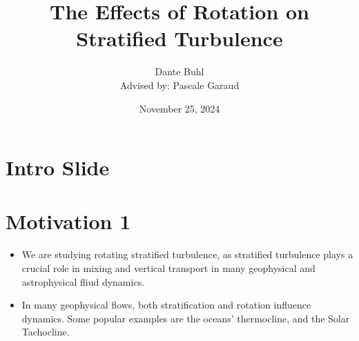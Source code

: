 \documentclass{article}
\begin{document}
\title{The Effects of Rotation on Stratified Turbulence}
\author{Dante Buhl \\{\small Advised by: Pascale Garaud}}
\date{November 25, 2024}


\newcommand{\wrms}{w_{\text{rms}}}
\newcommand{\bs}[1]{\boldsymbol{#1}}
\newcommand{\tb}[1]{\textbf{#1}}
\newcommand{\bmp}[1]{\begin{minipage}{#1\textwidth}}
\newcommand{\emp}{\end{minipage}}
\newcommand{\R}{\mathbb{R}}
\newcommand{\C}{\mathbb{C}}
\newcommand{\N}{\mathcal{N}}
\newcommand{\K}{\bs{\mathrm{K}}}
\newcommand{\m}{\bs{\mu}_*}
\newcommand{\s}{\bs{\Sigma}_*}
\newcommand{\dt}{\Delta t}
\newcommand{\dx}{\Delta x}
\newcommand{\tr}[1]{\text{Tr}(#1)}
\newcommand{\Tr}[1]{\text{Tr}(#1)}
\newcommand{\Div}{\nabla \cdot}
\renewcommand{\div}{\nabla \cdot}
\newcommand{\Curl}{\nabla \times}
\newcommand{\Grad}{\nabla}
\newcommand{\grad}{\nabla}
\newcommand{\grads}{\nabla_s}
\newcommand{\gradf}{\nabla_f}
\newcommand{\xs}{\bs{x}_s}
\newcommand{\xf}{\bs{x}_f}
\newcommand{\ts}{t_s}
\newcommand{\tf}{t_f}
\newcommand{\pt}{\partial t}
\newcommand{\pz}{\partial z}
\newcommand{\uvec}{\bs{u}}
\newcommand{\F}{\bs{F}}
\newcommand{\T}{\tilde{T}}
\newcommand{\ez}{\bs{e}_z}
\newcommand{\ex}{\bs{e}_x}
\newcommand{\ey}{\bs{e}_y}
\newcommand{\eo}{\bs{e}_{\bs{\Omega}}}
\newcommand{\ppt}[1]{\frac{\partial #1}{\partial t}}
\newcommand{\ppts}[1]{\frac{\partial #1}{\partial t_s}}
\newcommand{\pptf}[1]{\frac{\partial #1}{\partial t_f}}
\newcommand{\ppz}[1]{\frac{\partial #1}{\partial z}}
\newcommand{\ddz}[1]{\frac{d #1}{d z}}
\newcommand{\ppzetas}[1]{\frac{\partial^2 #1}{\partial \zeta^2}}
\newcommand{\ppzs}[1]{\frac{\partial #1}{\partial z_s}}
\newcommand{\ppzf}[1]{\frac{\partial #1}{\partial z_f}}
\newcommand{\ppx}[1]{\frac{\partial #1}{\partial x}}
\newcommand{\ppy}[1]{\frac{\partial #1}{\partial y}}
\newcommand{\ppzeta}[1]{\frac{\partial #1}{\partial \zeta}}


\maketitle 

\section{Intro Slide}

\section{Motivation 1}
\begin{itemize}
    \item We are studying rotating stratified turbulence, as stratified
    turbulence plays a crucial role in mixing and vertical transport in many
    geophysical and astrophysical fliud dynamics. 
    \item In many geophysical flows, both stratification and rotation influence
    dynamics. Some popular examples are the oceans' thermocline, and the Solar
    Tachocline. 
\end{itemize}
\end{document}
